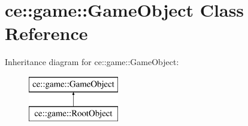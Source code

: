 \hypertarget{classce_1_1game_1_1_game_object}{}\section{ce\+:\+:game\+:\+:Game\+Object Class Reference}
\label{classce_1_1game_1_1_game_object}
Inheritance diagram for ce\+:\+:game\+:\+:Game\+Object\+:\begin{figure}[H]
\begin{center}
\leavevmode
\includegraphics[height=2.000000cm]{classce_1_1game_1_1_game_object}
\end{center}
\end{figure}
